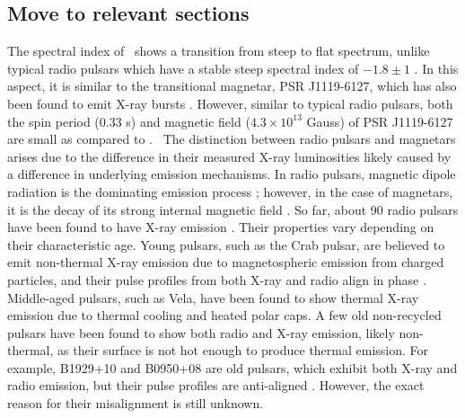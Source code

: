 \documentclass[twocolumn]{emulateapj}
\begin{document}
\subsection{Move to relevant sections}
\label{ssec:psr_compare}
The spectral index of \jmag\ shows a transition from steep to flat spectrum, unlike 
typical radio pulsars which have a stable steep spectral index of $-1.8 \pm 1$ 
\citep{maron2000}. In this aspect, it is similar to the transitional magnetar, 
PSR J1119-6127, which has also been found to emit X-ray bursts \citep{Gogus__2016}. 
However, similar to typical radio pulsars, both the spin period (0.33 s) and 
magnetic field ($4.3 \times 10^{13}$ Gauss) of PSR J1119-6127 are small as 
compared to \jmag. 
The distinction between radio pulsars and magnetars arises due to the difference 
in their measured X-ray luminosities likely caused by a difference in underlying 
emission mechanisms. In radio pulsars, magnetic dipole radiation is the dominating 
emission process \citep{kramer09}; however, in the case of magnetars, it is the 
decay of its strong internal magnetic field \citep{kaspi2017}. So far, about 90 
radio pulsars have been found to have X-ray emission \citep{becker2009}. Their 
properties vary depending on their characteristic age. Young pulsars, such as 
the Crab pulsar, are believed to emit non-thermal X-ray emission due to 
magnetospheric emission from charged particles, and their pulse profiles from 
both X-ray and radio align in phase \citep{becker2009}. Middle-aged pulsars, 
such as Vela, have been found to show thermal X-ray emission due to thermal 
cooling and heated polar caps. A few old non-recycled pulsars have been found 
to show both radio and X-ray emission, likely non-thermal, as their surface is 
not hot enough to produce thermal emission. For example, B1929+10 and B0950+08 
are old pulsars, which exhibit both X-ray and radio emission, but their pulse 
profiles are anti-aligned \citep{Becker_2006}. However, the exact reason for 
their misalignment is still unknown. 
\end{document}
